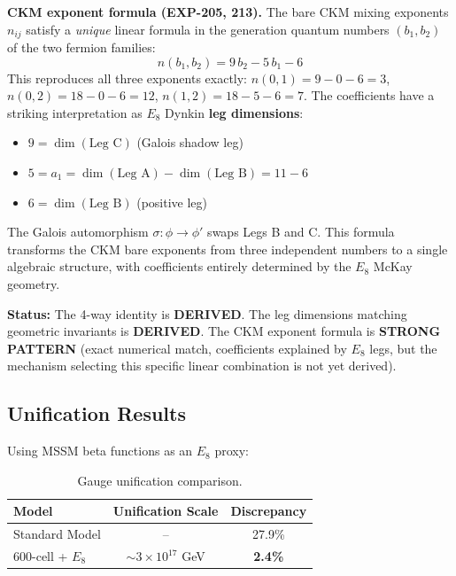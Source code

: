 \documentclass[12pt,a4paper]{article}
\begin{document}
\textbf{CKM exponent formula (EXP-205, 213).} The bare CKM mixing exponents $n_{ij}$ satisfy a \emph{unique} linear formula in the generation quantum numbers $(b_1, b_2)$ of the two fermion families:
\begin{equation}
\boxed{n(b_1, b_2) = 9\, b_2 - 5\, b_1 - 6}
\label{eq:ckm_exponent}
\end{equation}
This reproduces all three exponents exactly: $n(0,1) = 9-0-6 = 3$, $n(0,2) = 18-0-6 = 12$, $n(1,2) = 18-5-6 = 7$. The coefficients have a striking interpretation as $E_8$ Dynkin \textbf{leg dimensions}:
\begin{itemize}
    \item $9 = \dim(\text{Leg C})$ (Galois shadow leg)
    \item $5 = a_1 = \dim(\text{Leg A}) - \dim(\text{Leg B}) = 11 - 6$
    \item $6 = \dim(\text{Leg B})$ (positive leg)
\end{itemize}

The Galois automorphism $\sigma: \phi \to \phi'$ swaps Legs B and C. This formula transforms the CKM bare exponents from three independent numbers to a single algebraic structure, with coefficients entirely determined by the $E_8$ McKay geometry.

\textbf{Status:} The 4-way identity is \textbf{DERIVED}. The leg dimensions matching geometric invariants is \textbf{DERIVED}. The CKM exponent formula is \textbf{STRONG PATTERN} (exact numerical match, coefficients explained by $E_8$ legs, but the mechanism selecting this specific linear combination is not yet derived).

\subsection{Unification Results}

Using MSSM beta functions as an $E_8$ proxy:

\begin{table}[H]
\centering
\begin{tabular}{lcc}
\toprule
\textbf{Model} & \textbf{Unification Scale} & \textbf{Discrepancy} \\
\midrule
Standard Model & -- & 27.9\% \\
600-cell + $E_8$ & $\sim 3 \times 10^{17}$ GeV & \textbf{2.4\%} \\
\bottomrule
\end{tabular}
\caption{Gauge unification comparison.}
\end{table}
\end{document}
